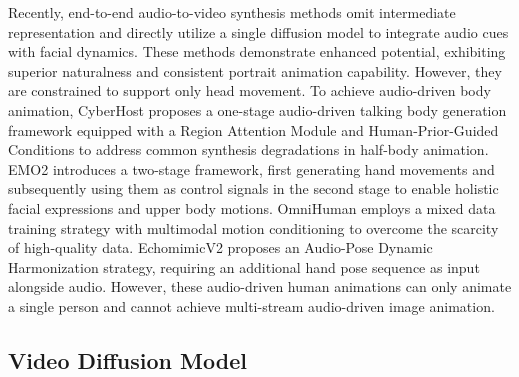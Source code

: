 \documentclass{article}
\begin{document}
Recently, end-to-end audio-to-video synthesis methods \cite{tian2024emo,wei2024aniportrait,xu2024hallo,chen2025echomimic,cui2024hallo3,ji2024sonic,li2024latentsync,jiang2024loopy} omit intermediate representation and directly utilize a single diffusion model to integrate audio cues with facial dynamics. These methods demonstrate enhanced potential, exhibiting superior naturalness and consistent portrait animation capability. However, they are constrained to support only head movement.
To achieve audio-driven body animation, CyberHost \cite{lincyberhost} proposes a one-stage audio-driven talking body generation framework equipped with a Region Attention Module and Human-Prior-Guided Conditions to address common synthesis degradations in half-body animation. EMO2 \cite{tian2025emo2} introduces a two-stage framework, first generating hand movements and subsequently using them as control signals in the second stage to enable holistic facial expressions and upper body motions. OmniHuman \cite{lin2025omnihuman} employs a mixed data training strategy with multimodal motion conditioning to overcome the scarcity of high-quality data. EchomimicV2 \cite{meng2024echomimicv2} proposes an Audio-Pose Dynamic Harmonization strategy, requiring an additional hand pose sequence as input alongside audio.
However, these audio-driven human animations can only animate a single person and cannot achieve multi-stream audio-driven image animation.


\subsection{Video Diffusion Model}
\end{document}
